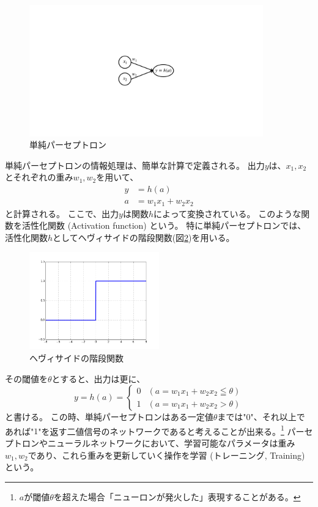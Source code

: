 \begin{figure}[htbp]
 \centering
 \includegraphics[trim = 250 300 250 300, width=0.9\textwidth, clip]{Figure/2DeepLearning/2SimplePerceptron.png}
 \caption{単純パーセプトロン}
 \label{2SimplePerceptron}
\end{figure}

単純パーセプトロンの情報処理は、簡単な計算で定義される。
出力$y$は、$x_1,x_2$とそれぞれの重み$w_1,w_2$を用いて、
\begin{equation}
 \begin{split}
  y &= h(a)\\
  a &= w_1x_1 + w_2x_2
 \end{split}
\end{equation}
と計算される。
ここで、出力$y$は関数$h$によって変換されている。
このような関数を活性化関数 (Activation function) という。
特に単純パーセプトロンでは、活性化関数$h$としてヘヴィサイドの階段関数(図\ref{3HeavisideStepFunction})を用いる。

\begin{figure}[htbp]
 \centering
 \includegraphics[width=0.5\textwidth]{Figure/2DeepLearning/3HeavisideStepFunction.png}
 \caption{ヘヴィサイドの階段関数}
 \label{3HeavisideStepFunction}
\end{figure}

その閾値を$\theta$とすると、出力は更に、
\begin{equation}
 y = h(a) = \left\{ \begin{array}{ll}
    0 & (a = w_1x_1 + w_2x_2 \leqq \theta) \\
    1 & (a = w_1x_1 + w_2x_2 > \theta)
 \end{array} \right.
\end{equation}
と書ける。
この時、単純パーセプトロンはある一定値$\theta$までは"$0$"、それ以上であれば"$1$"を返す二値信号のネットワークであると考えることが出来る。\footnote{$a$が閾値$\theta$を超えた場合「ニューロンが発火した」表現することがある。}
パーセプトロンやニューラルネットワークにおいて、学習可能なパラメータは重み$w_1,w_2$であり、これら重みを更新していく操作を学習 (トレーニング, Training) という。


